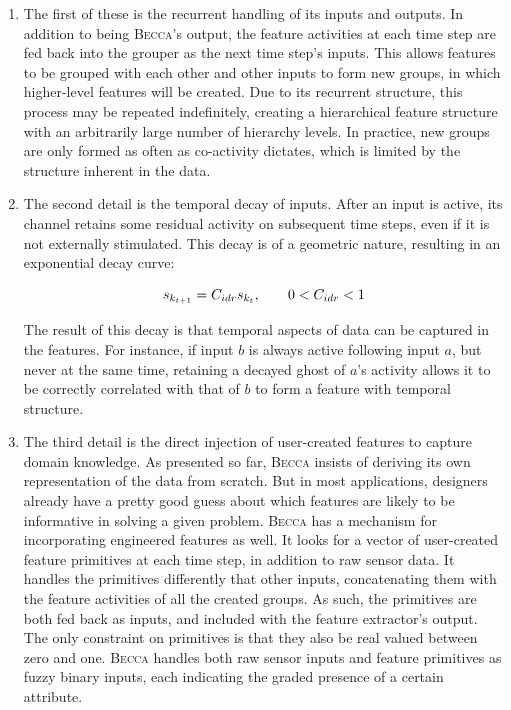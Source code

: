 \begin{enumerate}

\item The first of these is the recurrent handling of its inputs and outputs. In addition to being \textsc{Becca}'s output, the feature activities at each time step are fed back into the grouper as the next time step's inputs. This allows features to be grouped with each other and other inputs to form new groups, in which higher-level features will be created. Due to its recurrent structure, this process may be repeated indefinitely, creating a hierarchical feature structure with an arbitrarily large number of hierarchy levels. In practice, new groups are only formed as often as co-activity dictates, which is limited by the structure inherent in the data.

\item The second detail is the temporal decay of inputs. After an input is active, its channel retains some residual activity on subsequent time steps, even if it is not externally stimulated. This decay is of a geometric nature, resulting in an exponential decay curve: 

\begin{equation}
s_{k_{t+1}} = C_{idr} s_{k_t} \mbox{,   \hspace{0.2in}  } 0 < C_{idr} < 1
\end{equation}

The result of this decay is that temporal aspects of data can be captured in the features. For instance, if input $b$ is always active following input $a$, but never at the same time, retaining a decayed ghost of $a$'s activity allows it to be correctly correlated with that of $b$ to form a feature with temporal structure.

\item The third detail is the direct injection of user-created features to capture domain knowledge. As presented so far, \textsc{Becca} insists of deriving its own representation of the data from scratch. But in most applications, designers already have a pretty good guess about which features are likely to be informative in solving a given problem. \textsc{Becca} has a mechanism for incorporating engineered features as well. It looks for a vector of user-created feature primitives at each time step, in addition to raw sensor data. It handles the primitives differently that other inputs, concatenating them with the feature activities of all the created groups. As such, the primitives are both fed back as inputs, and included with the feature extractor's output. The only constraint on primitives is that they also be real valued between zero and one. \textsc{Becca} handles both raw sensor inputs and feature primitives as fuzzy binary inputs, each indicating the graded presence of a certain attribute.

\end{enumerate}


